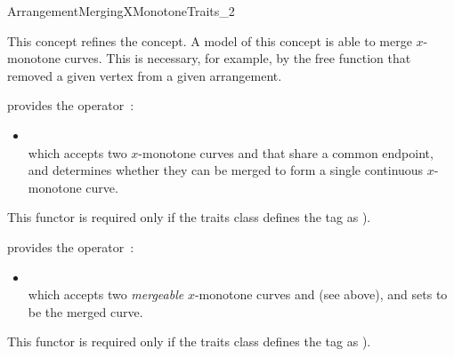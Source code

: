 \ccRefPageBegin

\begin{ccRefConcept}{ArrangementMergingXMonotoneTraits_2}

\ccThreeToTwo

\ccDefinition

This concept refines the  concept.
A model of this concept is able to merge $x$-monotone curves. This
is necessary, for example, by the  free function
that removed a given vertex from a given arrangement.

\ccRefines
{}





\ccThreeToTwo

{provides the operator~:
 \begin{itemize}
 \item {} \\
 which accepts two $x$-monotone curves  and  that share
 a common endpoint, and determines whether they can be merged to form a single
 continuous $x$-monotone curve.
 \end{itemize}
 This functor is required only if the traits class defines the
  tag as ).}

{provides the operator~:
 \begin{itemize}
 \item {} \\
 which accepts two {\sl mergeable} $x$-monotone curves  and 
 (see above), and sets  to be the merged curve.
 \end{itemize}
 This functor is required only if the traits class defines the
  tag as ).} 


\end{ccRefConcept}
